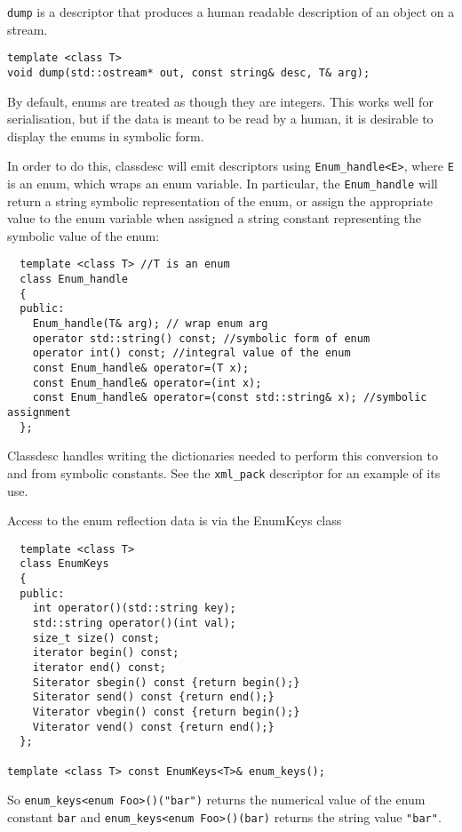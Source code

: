 
\verb+dump+ is a descriptor that produces a human readable description of
an object on a stream.
\begin{verbatim}
template <class T>
void dump(std::ostream* out, const string& desc, T& arg); 
\end{verbatim}

\label{symbolic enums}

By default, enums are treated as though they are integers. This works
well for serialisation, but if the data is meant to be read by a
human, it is desirable to display the enums in symbolic form.

In order to do this, classdesc will emit descriptors using
\verb+Enum_handle<E>+, where \verb+E+ is an enum, which wraps an enum
variable. In particular, the \verb+Enum_handle+ will return a string
symbolic representation of the enum, or assign the appropriate value
to the enum variable when assigned a string constant representing the
symbolic value of the enum:
\begin{verbatim}
  template <class T> //T is an enum
  class Enum_handle
  {
  public:
    Enum_handle(T& arg); // wrap enum arg
    operator std::string() const; //symbolic form of enum
    operator int() const; //integral value of the enum
    const Enum_handle& operator=(T x);
    const Enum_handle& operator=(int x);
    const Enum_handle& operator=(const std::string& x); //symbolic assignment  
  };
\end{verbatim}
Classdesc handles writing the dictionaries needed to perform this
conversion to and from symbolic constants. See the \verb+xml_pack+
descriptor for an example of its use.

Access to the enum reflection data is via the EnumKeys class
\begin{verbatim}
  template <class T>
  class EnumKeys
  {
  public:
    int operator()(std::string key);
    std::string operator()(int val);
    size_t size() const;
    iterator begin() const;
    iterator end() const;
    Siterator sbegin() const {return begin();}
    Siterator send() const {return end();}
    Viterator vbegin() const {return begin();}
    Viterator vend() const {return end();}
  };

template <class T> const EnumKeys<T>& enum_keys();
\end{verbatim}
So \verb+enum_keys<enum Foo>()("bar")+ returns the numerical value of
the enum constant \verb+bar+ and \verb+enum_keys<enum Foo>()(bar)+
returns the string value \verb+"bar"+.

